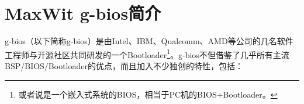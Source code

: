 \section{MaxWit g-bios简介}

g-bios（以下简称g-bios）是由Intel、IBM、Qualcomm、AMD等公司的几名软件工程师与开源社区共同研发的一个Bootloader\footnote{或者说是一个嵌入式系统的BIOS，相当于PC机的BIOS+Bootloader。}。g-bios不但借鉴了几乎所有主流BSP/BIOS/Bootloader的优点，而且加入不少独创的特性，包括：
